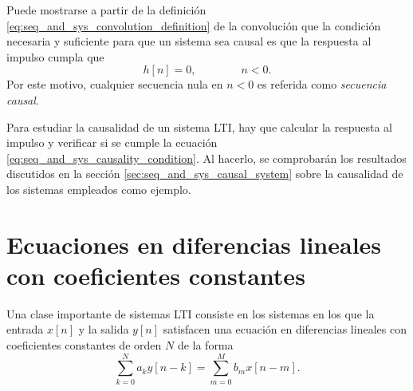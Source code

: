 \documentclass[a4paper]{report}
\begin{document}
Puede mostrarse a partir de la definición \ref{eq:seq_and_sys_convolution_definition} de la convolución que la condición necesaria y suficiente para que un sistema sea causal es que la respuesta al impulso cumpla que 
\begin{equation}\label{eq:seq_and_sys_causality_condition}
 h[n]=0,
 \qquad\qquad
 n<0. 
\end{equation}
Por este motivo, cualquier secuencia nula en \(n<0\) es referida como \emph{secuencia causal}.

Para estudiar la causalidad de un sistema LTI, hay que calcular la respuesta al impulso y verificar si se cumple la ecuación \ref{eq:seq_and_sys_causality_condition}. Al hacerlo, se comprobarán los resultados discutidos en la sección \ref{sec:seq_and_sys_causal_system} sobre la causalidad de los sistemas empleados como ejemplo.

\section{Ecuaciones en diferencias lineales con coeficientes constantes}\label{sec:seq_and_sys_constant_coefficient_difference_equations} 

Una clase importante de sistemas LTI consiste en los sistemas en los que la entrada \(x[n]\) y la salida \(y[n]\) satisfacen una ecuación en diferencias lineales con coeficientes constantes de orden \(N\) de la forma
\begin{equation}\label{eq:seq_and_sys_difference_equation_general}
 \sum_{k=0}^Na_ky[n-k]=\sum_{m=0}^Mb_mx[n-m]. 
\end{equation}
\end{document}
